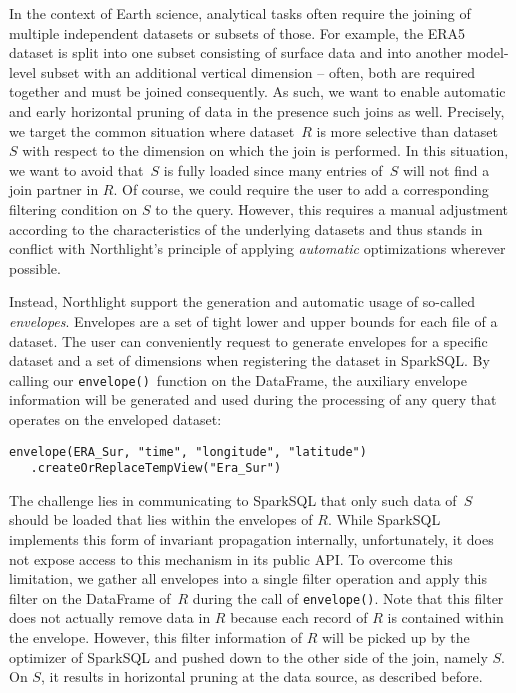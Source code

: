 \documentclass[conference]{IEEEtran}
\newcommand{\system}{Northlight}
\newcommand{\smalltt}[1]{{\texttt{\small #1}}}
\begin{document}
In the context of Earth science, analytical tasks often require the joining of multiple independent datasets or subsets of those. For example, the ERA5 dataset is split into one subset consisting of surface data and into another model-level subset with an additional vertical dimension -- often, both are required together and must be joined consequently. As such, we want to enable automatic and early horizontal pruning of data in the presence such joins as well. 
Precisely, we target the common situation where dataset~$R$ is more selective than dataset~$S$ with respect to the dimension on which the join is performed. In this situation, we want to avoid that~$S$ is fully loaded since many entries of~$S$ will not find a join partner in $R$. Of course, we could require the user to add a corresponding filtering condition on $S$ to the query. However, this requires a manual adjustment according to the characteristics of the underlying datasets and thus stands in conflict with \system{}'s principle of applying \textit{automatic} optimizations wherever possible. 

Instead, \system{} support the generation and automatic usage of so-called \textit{envelopes}. Envelopes are a set of tight lower and upper bounds for each file of a dataset. The user can conveniently request to generate envelopes for a specific dataset and a set of dimensions when registering the dataset in SparkSQL. By calling our \smalltt{envelope()}~function on the DataFrame, the auxiliary envelope information will be generated and used during the processing of any query that operates on the enveloped dataset:
\noindent
\begin{minipage}{\linewidth}
\begin{lstlisting}[style=sql, label={listing:envelopes}]
envelope(ERA_Sur, "time", "longitude", "latitude")
   .createOrReplaceTempView("Era_Sur")
\end{lstlisting}
\end{minipage}

The challenge lies in communicating to SparkSQL that only such data of~$S$ should be loaded that lies within the envelopes of $R$. While SparkSQL implements this form of invariant propagation internally\cite{lit:invariants}, unfortunately, it does not expose access to this mechanism in its public API.
To overcome this limitation, we gather all envelopes into a single filter operation and apply this filter on the DataFrame of~$R$ during the call of \smalltt{envelope()}. Note that this filter does not actually remove data in $R$ because each record of $R$ is contained within the envelope. However, this filter information of $R$ will be picked up by the optimizer of SparkSQL and pushed down to the other side of the join, namely $S$. On $S$, it results in horizontal pruning at the data source, as described before. 
\end{document}
